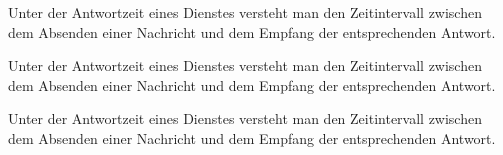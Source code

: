 \documentclass[a4paper,12pt]{scrreprt}
\begin{document}
\begin{beispiel}[Antwortzeit]
Unter der Antwortzeit eines Dienstes versteht man den Zeitintervall zwischen dem
Absenden einer Nachricht und dem Empfang der entsprechenden Antwort. 
\end{beispiel}

\begin{theo}[Antwortzeit]
Unter der Antwortzeit eines Dienstes versteht man den Zeitintervall zwischen dem
Absenden einer Nachricht und dem Empfang der entsprechenden Antwort. 
\end{theo}

\begin{exam}[Antwortzeit]
Unter der Antwortzeit eines Dienstes versteht man den Zeitintervall zwischen dem
Absenden einer Nachricht und dem Empfang der entsprechenden Antwort. 
\end{exam}
\end{document}

